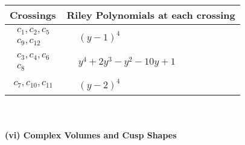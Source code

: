 \documentclass[1p]{elsarticle_modified}
\theoremstyle{definition}
\begin{document}
\begin{tabular}{m{50pt}|m{274pt}}
Crossings & \hspace{64pt}Riley Polynomials at each crossing \\
\hline $$\begin{aligned}c_{1},c_{2},c_{5}\\c_{9},c_{12}\end{aligned}$$&$\begin{aligned}
&(y-1)^4
\end{aligned}$\\
\hline $$\begin{aligned}c_{3},c_{4},c_{6}\\c_{8}\end{aligned}$$&$\begin{aligned}
&y^4+2 y^3- y^2-10 y+1
\end{aligned}$\\
\hline $$\begin{aligned}c_{7},c_{10},c_{11}\end{aligned}$$&$\begin{aligned}
&(y-2)^4
\end{aligned}$\\
\hline
\end{tabular}\\~\\
\newpage\flushleft \textbf{(vi) Complex Volumes and Cusp Shapes}
\end{document}

